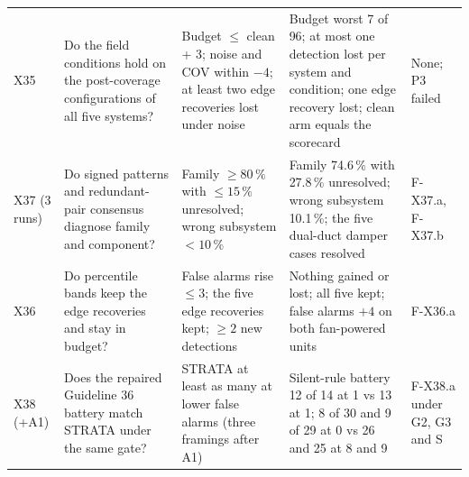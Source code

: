 \documentclass[11pt,letterpaper]{article}
\begin{document}
{\begin{longtable}{@{}>{\raggedright\arraybackslash}p{0.9cm}>{\raggedright\arraybackslash}p{4.3cm}>{\raggedright\arraybackslash}p{3.2cm}>{\raggedright\arraybackslash}p{4.2cm}>{\raggedright\arraybackslash}p{2.4cm}@{}}
X35 & Do the field conditions hold on the post-coverage configurations of all five systems? & Budget $\le$ clean + 3; noise and COV within $-4$; at least two edge recoveries lost under noise & Budget worst 7 of 96; at most one detection lost per system and condition; one edge recovery lost; clean arm equals the scorecard & None; P3 failed \\
X37 (3 runs) & Do signed patterns and redundant-pair consensus diagnose family and component? & Family $\ge 80\,\%$ with $\le 15\,\%$ unresolved; wrong subsystem $< 10\,\%$ & Family 74.6\,\% with 27.8\,\% unresolved; wrong subsystem 10.1\,\%; the five dual-duct damper cases resolved & F-X37.a, F-X37.b \\
X36 & Do percentile bands keep the edge recoveries and stay in budget? & False alarms rise $\le 3$; the five edge recoveries kept; $\ge 2$ new detections & Nothing gained or lost; all five kept; false alarms $+4$ on both fan-powered units & F-X36.a \\
X38 (+A1) & Does the repaired Guideline 36 battery match STRATA under the same gate? & STRATA at least as many at lower false alarms (three framings after A1) & Silent-rule battery 12 of 14 at 1 vs 13 at 1; 8 of 30 and 9 of 29 at 0 vs 26 and 25 at 8 and 9 & F-X38.a under G2, G3 and S \\
\hline
\end{longtable}}




\end{document}
